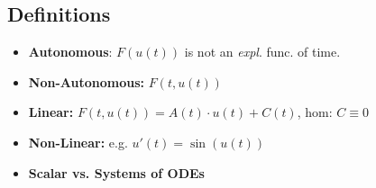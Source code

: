 \subsection{Definitions}
    \begin{itemize}
        \item \textbf{Autonomous}: $F(u(t))$ is not an \textit{expl}. func. of time.
        \item \textbf{Non-Autonomous:}  $F(t,u(t))$
        \item \textbf{Linear:} $F(t,u(t)) = A(t) \cdot u(t) + C(t)$, \hfill hom: $C \equiv 0$
        \item \textbf{Non-Linear:} e.g. $u'(t) = \sin(u(t))$
        \item \textbf{Scalar vs. Systems of ODEs}
    \end{itemize}
